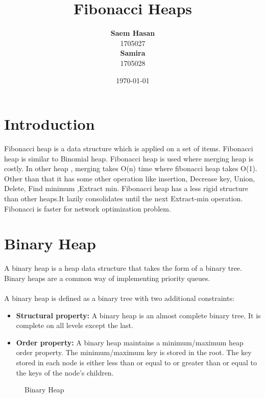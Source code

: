 \documentclass[14pt,a4paper]{report}
\title{\textbf{Fibonacci Heaps}}
\author{\textbf{Saem Hasan}\\1705027\\\textbf{Samira}\\1705028}
\affil{Department of Computer Science \& Engineering}
\affil{Bangladesh University of Engineering and Technology}
\date{\today}
\begin{document}
\maketitle
\tableofcontents
\pagebreak

\chapter{Introduction}
Fibonacci heap is a data structure which is applied on a set of items. Fibonacci heap is similar to Binomial heap. Fibonacci heap is used where merging heap is costly. In other heap , merging takes O(n) time where fibonacci heap takes O(1). Other than that it has some other operation like insertion, Decrease key, Union, Delete, Find minimum ,Extract min. Fibonacci heap has a less rigid structure than other heaps.It lazily consolidates until the next Extract-min operation. Fibonacci is faster for network optimization problem.
\chapter{Binary Heap}
A binary heap is a heap data structure that takes the form of a binary tree. Binary heaps are a common way of implementing priority queues. \\ \\
A binary heap is defined as a binary tree with two additional constraints: 
\begin{itemize}
    \item \textbf{Structural property:} A binary heap is an almost complete binary tree. It is complete on all levels except the last. 
    \item \textbf{Order property:} A binary heap maintains a minimum/maximum heap order property. The minimum/maximum key is stored in the root. The key stored in each node is either less than or equal to or greater than or equal to the keys of the node's children. 
\end{itemize}

\begin{figure}[H]
    \centering
    \caption{Binary Heap}
    \label{fig:my_label}
\end{figure}
   
\end{document}
